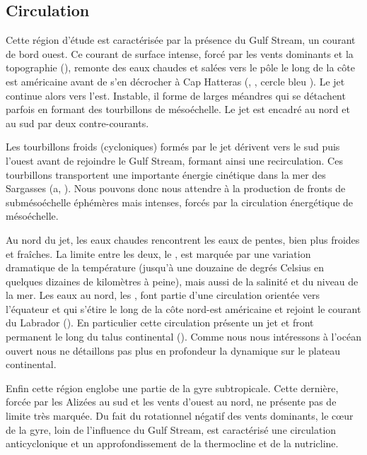 \subsection{Circulation}
\label{sec:gs-physique}

Cette région d'étude est caractérisée par la présence du Gulf Stream, un courant de bord ouest.
Ce courant de surface intense, forcé par les vents dominants et la topographie (\cite{fieux_2010}), remonte des eaux chaudes et salées vers le pôle le long de la côte est américaine avant de s'en décrocher à Cap Hatteras (, , cercle bleu ).
Le jet continue alors vers l'est. Instable, il forme de larges méandres qui se détachent parfois en formant des tourbillons de mésoéchelle.
Le jet est encadré au nord et au sud par deux contre-courants.

Les tourbillons froids (cycloniques) formés par le jet dérivent vers le sud puis l'ouest avant de rejoindre le Gulf Stream, formant ainsi une recirculation.
Ces tourbillons transportent une importante énergie cinétique dans la mer des Sargasses (a, \cite{wunsch_1998,zhai_2008}).
Nous pouvons donc nous attendre à la production de fronts de submésoéchelle éphémères mais intenses, forcés par la circulation énergétique de mésoéchelle.

Au nord du jet, les eaux chaudes rencontrent les eaux de pentes, bien plus froides et fraîches.
La limite entre les deux, le , est marquée par une variation dramatique de la température (jusqu'à une douzaine de degrés Celsius en quelques dizaines de kilomètres à peine), mais aussi de la salinité et du niveau de la mer.
Les eaux au nord, les , font partie d'une circulation orientée vers l'équateur et qui s'étire le long de la côte nord-est américaine et rejoint le courant du Labrador (\cite{fieux_2010,townsend_2004}).
En particulier cette circulation présente un jet et front permanent le long du talus continental (\cite{linder_1998,flagg_2006}).
Comme nous nous intéressons à l'océan ouvert nous ne détaillons pas plus en profondeur la dynamique sur le plateau continental.

Enfin cette région englobe une partie de la gyre subtropicale.
Cette dernière, forcée par les Alizées au sud et les vents d'ouest au nord, ne présente pas de limite très marquée.
Du fait du rotationnel négatif des vents dominants, le cœur de la gyre, loin de l'influence du Gulf Stream, est caractérisé une circulation anticyclonique et un approfondissement de la thermocline et de la nutricline.

